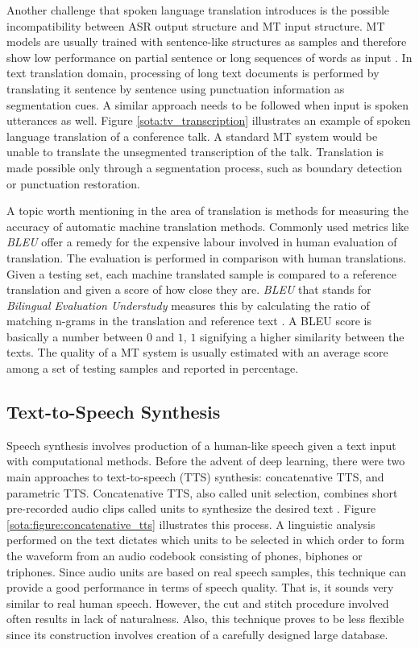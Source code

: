 Another challenge that spoken language translation introduces is the possible incompatibility between ASR output structure and MT input structure. MT models are usually trained with sentence-like structures as samples and therefore show low performance on partial sentence or long sequences of words as input \citep{niehues2018}. In text translation domain, processing of long text documents is performed by translating it sentence by sentence using punctuation information as segmentation cues. A similar approach needs to be followed when input is spoken utterances as well. Figure \ref{sota:tv_transcription} illustrates an example of spoken language translation of a conference talk. A standard MT system would be unable to translate the unsegmented transcription of the talk. Translation is made possible only through a segmentation process, such as boundary detection or punctuation restoration. 

A topic worth mentioning in the area of translation is methods for measuring the accuracy of automatic machine translation methods. Commonly used metrics like \textit{BLEU} offer a remedy for the expensive labour involved in human evaluation of translation. The evaluation is performed in comparison with human translations. Given a testing set, each machine translated sample is compared to a reference translation and given a score of how close they are. \textit{BLEU} that stands for \textit{Bilingual Evaluation Understudy} measures this by calculating the ratio of matching n-grams in the translation and reference text \citep{bleu}. A BLEU score is basically a number between $0$ and $1$, $1$ signifying a higher similarity between the texts. The quality of a MT system is usually estimated with an average score among a set of testing samples and reported in percentage. 

\subsection{Text-to-Speech Synthesis}
\label{sota:tts}

Speech synthesis involves production of a human-like speech given a text input with computational methods. Before the advent of deep learning, there were two main approaches to text-to-speech (TTS) synthesis: concatenative TTS, and parametric TTS. Concatenative TTS, also called unit selection, combines short pre-recorded audio clips called units to synthesize the desired text \citep{vanSanten:1997:PSS:241679}. Figure \ref{sota:figure:concatenative_tts} illustrates this process. A linguistic analysis performed on the text dictates which units to be selected in which order to form the waveform from an audio codebook consisting of phones, biphones or triphones. Since audio units are based on real speech samples, this technique can provide a good performance in terms of speech quality. That is, it sounds very similar to real human speech. However, the cut and stitch procedure involved often results in lack of naturalness. Also, this technique proves to be less flexible since its construction involves creation of a carefully designed large database. 

